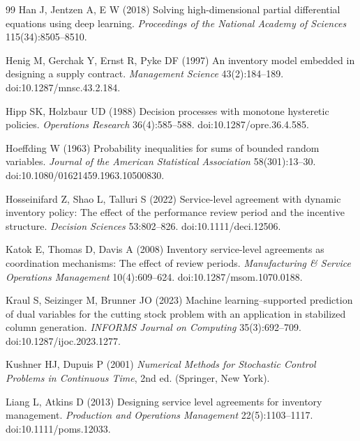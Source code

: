 \documentclass[11pt,letterpaper]{article}
\theoremstyle{definition}
\newcommand{\1}{\mathbf 1}
\begin{document}
\begin{thebibliography}{99}
Han J, Jentzen A, E W (2018) Solving high-dimensional partial differential equations using deep learning. \emph{Proceedings of the National Academy of Sciences} 115(34):8505--8510.

Henig M, Gerchak Y, Ernst R, Pyke DF (1997) An inventory model embedded in designing a supply contract. \emph{Management Science} 43(2):184--189. doi:10.1287/mnsc.43.2.184.

Hipp SK, Holzbaur UD (1988) Decision processes with monotone hysteretic policies. \emph{Operations Research} 36(4):585--588. doi:10.1287/opre.36.4.585.

Hoeffding W (1963) Probability inequalities for sums of bounded random variables. \emph{Journal of the American Statistical Association} 58(301):13--30. doi:10.1080/01621459.1963.10500830.

Hosseinifard Z, Shao L, Talluri S (2022) Service-level agreement with dynamic inventory policy: The effect of the performance review period and the incentive structure. \emph{Decision Sciences} 53:802--826. doi:10.1111/deci.12506.

Katok E, Thomas D, Davis A (2008) Inventory service-level agreements as coordination mechanisms: The effect of review periods. \emph{Manufacturing \& Service Operations Management} 10(4):609--624. doi:10.1287/msom.1070.0188.

Kraul S, Seizinger M, Brunner JO (2023) Machine learning--supported prediction of dual variables for the cutting stock problem with an application in stabilized column generation. \emph{INFORMS Journal on Computing} 35(3):692--709. doi:10.1287/ijoc.2023.1277.

Kushner HJ, Dupuis P (2001) \emph{Numerical Methods for Stochastic Control Problems in Continuous Time}, 2nd ed. (Springer, New York).

Liang L, Atkins D (2013) Designing service level agreements for inventory management. \emph{Production and Operations Management} 22(5):1103--1117. doi:10.1111/poms.12033.


\end{thebibliography}
\end{document}
